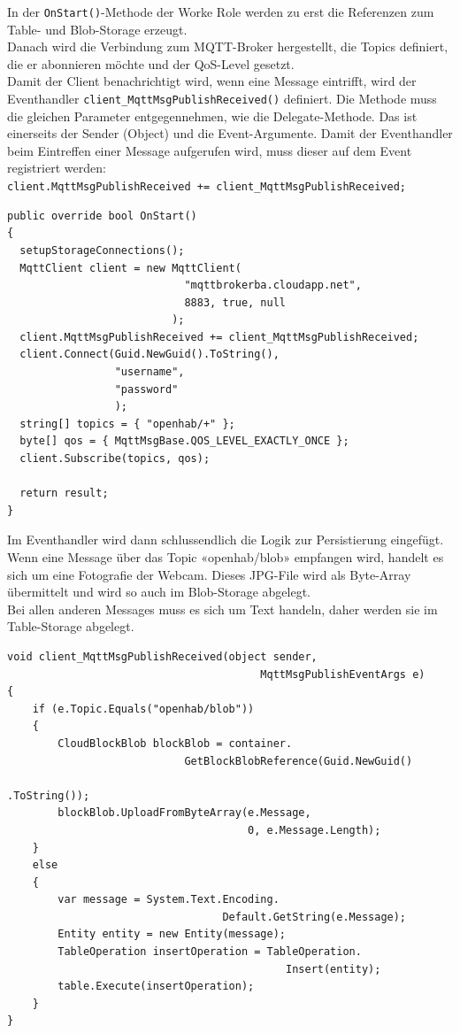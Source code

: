 In der \lstinline!OnStart()!-Methode der Worke Role werden zu erst die Referenzen zum Table- und Blob-Storage erzeugt. \\
Danach wird die Verbindung zum MQTT-Broker hergestellt, die Topics definiert, die er abonnieren möchte und der QoS-Level gesetzt. \\
Damit der Client benachrichtigt wird, wenn eine Message eintrifft, wird der Eventhandler \lstinline!client_MqttMsgPublishReceived()! definiert. Die Methode muss die gleichen Parameter entgegennehmen, wie die Delegate-Methode. Das ist einerseits der Sender (Object) und die Event-Argumente. Damit der Eventhandler beim Eintreffen einer Message aufgerufen wird, muss dieser auf dem Event registriert werden: \\ \lstinline!client.MqttMsgPublishReceived += client_MqttMsgPublishReceived;! 

\begin{lstlisting}[style=csharp, caption=WorkerRole.cs - MQTT Topic Subscribe]
public override bool OnStart()
{
  setupStorageConnections();
  MqttClient client = new MqttClient(
            				"mqttbrokerba.cloudapp.net",
               				8883, true, null
               			  );
  client.MqttMsgPublishReceived += client_MqttMsgPublishReceived;
  client.Connect(Guid.NewGuid().ToString(),
  				 "username",
  				 "password"
  				 );
  string[] topics = { "openhab/+" };
  byte[] qos = { MqttMsgBase.QOS_LEVEL_EXACTLY_ONCE };
  client.Subscribe(topics, qos);

  return result;
}
\end{lstlisting}

Im Eventhandler wird dann schlussendlich die Logik zur Persistierung eingefügt. Wenn eine Message über das Topic «openhab/blob» empfangen wird, handelt es sich um eine Fotografie der Webcam. Dieses JPG-File wird als Byte-Array übermittelt und wird so auch im Blob-Storage abgelegt. \\
Bei allen anderen Messages muss es sich um Text handeln, daher werden sie im Table-Storage abgelegt.

\begin{lstlisting}[style=csharp, caption=WorkerRole.cs - EventHandler]
void client_MqttMsgPublishReceived(object sender,
								   		MqttMsgPublishEventArgs e)
{
	if (e.Topic.Equals("openhab/blob"))
	{
		CloudBlockBlob blockBlob = container.
							GetBlockBlobReference(Guid.NewGuid()
								   							.ToString());
		blockBlob.UploadFromByteArray(e.Message,
									  0, e.Message.Length);
    }
	else
	{
    	var message = System.Text.Encoding.
    							  Default.GetString(e.Message);
		Entity entity = new Entity(message);
		TableOperation insertOperation = TableOperation.
											Insert(entity);
		table.Execute(insertOperation);
	}
}
\end{lstlisting}

